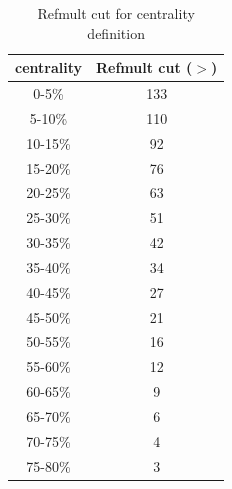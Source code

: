 \begin{table}[h]
    \centering
    \begin{tabular}{c|c}
    \hline
        centrality & Refmult cut ($>$) \\
        \hline
        0-5\% &  133 \\ 
        5-10\% & 110 \\
        10-15\% & 92 \\
        15-20\% & 76 \\
        20-25\% & 63 \\
        25-30\% & 51 \\
        30-35\% & 42 \\
        35-40\% & 34 \\ 
        40-45\% & 27 \\
        45-50\% & 21 \\
        50-55\% & 16 \\
        55-60\% & 12 \\
        60-65\% & 9 \\
        65-70\% & 6 \\
        70-75\% & 4 \\
        75-80\% & 3 \\
        \hline
    \end{tabular}
    \caption{Refmult cut for centrality definition}
    \label{tab:cent_def}
\end{table}


